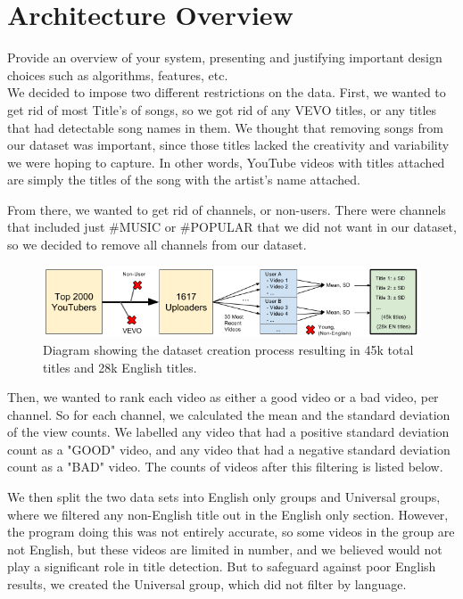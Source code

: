 \documentclass[a4paper,12pt]{article}
\begin{document}
\section{Architecture Overview}
Provide an overview of your system, presenting and justifying important design choices such as algorithms, features, etc.\\



We decided to impose two different restrictions on the data. First, we wanted to get rid of most Title's of songs, so we got rid of any VEVO titles, or any titles that had detectable song names in them. We thought that removing songs from our dataset was important, since those titles lacked the creativity and variability we were hoping to capture. In other words, YouTube videos with titles attached are simply the titles of the song with the artist's name attached. 

From there, we wanted to get rid of channels, or non-users. There were channels that included just \#MUSIC or \#POPULAR that we did not want in our dataset, so we decided to remove all channels from our dataset. 


\begin{figure}[h]
    \centering
    \includegraphics[width=.99\textwidth]{dataset}
    \caption{Diagram showing the dataset creation process resulting in 45k total titles and 28k English titles.}
    \label{fig:dataset}
\end{figure}

Then, we wanted to rank each video as either a good video or a bad video, per channel. So for each channel, we calculated the mean and the standard deviation of the view counts. We labelled any video that had a positive standard deviation count as a "GOOD" video, and any video that had a negative standard deviation count as a "BAD" video. The counts of videos after this filtering is listed below. 

We then split the two data sets into English only groups and Universal groups, where we filtered any non-English title out in the English only section. However, the program doing this was not entirely accurate, so some videos in the group are not English, but these videos are limited in number, and we believed would not play a significant role in title detection. But to safeguard against poor English results, we created the Universal group, which did not filter by language. 
\end{document}
